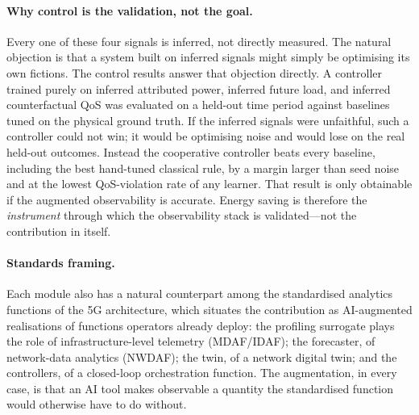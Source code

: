 \paragraph{Why control is the validation, not the goal.} Every one of these four
signals is inferred, not directly measured. The natural objection is that a
system built on inferred signals might simply be optimising its own fictions. The
control results answer that objection directly. A controller trained purely on
inferred attributed power, inferred future load, and inferred counterfactual QoS
was evaluated on a held-out time period against baselines tuned on the physical
ground truth. If the inferred signals were unfaithful, such a controller could
not win; it would be optimising noise and would lose on the real held-out
outcomes. Instead the cooperative controller beats every baseline, including the
best hand-tuned classical rule, by a margin larger than seed noise and at the
lowest QoS-violation rate of any learner. That result is only obtainable if the
augmented observability is accurate. Energy saving is therefore the
\emph{instrument} through which the observability stack is validated---not the
contribution in itself.

\paragraph{Standards framing.} Each module also has a natural counterpart among
the standardised analytics functions of the 5G architecture, which situates the
contribution as AI-augmented realisations of functions operators already deploy:
the profiling surrogate plays the role of infrastructure-level telemetry
(MDAF/IDAF); the forecaster, of network-data analytics (NWDAF); the twin, of a
network digital twin; and the controllers, of a closed-loop orchestration
function. The augmentation, in every case, is that an AI tool makes observable a
quantity the standardised function would otherwise have to do without.

